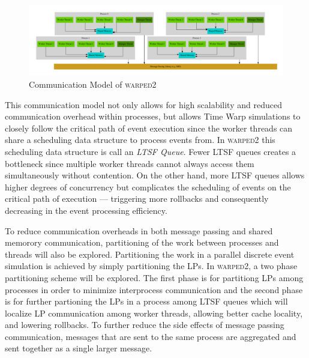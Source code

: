 \documentclass[11pt]{book}
\begin{document}
\begin{figure}
    \centering
    \includegraphics[width=\textwidth,quiet]{figs/graphviz/warped_communication.pdf}
    \caption{Communication Model of \textsc{warped2}}\label{warped2_communication}
\end{figure}

This communication model not only allows for high scalability and reduced communication overhead
within processes, but allows Time Warp simulations to closely follow the critical path of event
execution since the worker threads can share a scheduling data structure to process events from.  In
\textsc{warped2} this scheduling data structure is call an \emph{LTSF Queue}.  Fewer LTSF queues
creates a bottleneck since multiple worker threads cannot always access them simultaneously without
contention.  On the other hand, more LTSF queues allows higher degrees of concurrency but
complicates the scheduling of events on the critical path of execution --- triggering more rollbacks
and consequently decreasing in the event processing efficiency.

To reduce communication overheads in both message passing and shared memorory communication,
partitioning of the work between processes and threads will also be explored.  Partitioning the work
in a parallel discrete event simulation is achieved by simply partitioning the LPs.  In
\textsc{warped2}, a two phase partitioning scheme will be explored.  The first phase is for
partitiong LPs among processes in order to minimize interprocess communication and the second phase
is for further partioning the LPs in a process among LTSF queues which will localize LP
communication among worker threads, allowing better cache locality, and lowering rollbacks.  To
further reduce the side effects of message passing communication, messages that are sent to the same
process are aggregated and sent together as a single larger message.
\end{document}
